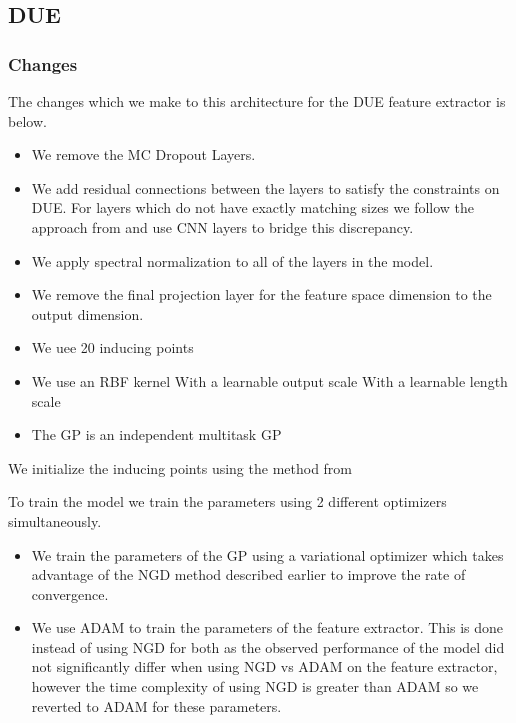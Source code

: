 \documentclass[12pt, a4paper]{report}
\theoremstyle{definition}
\theoremstyle{definition}
\theoremstyle{definition}
\begin{document}
\subsection{DUE}





\subsubsection{Changes}
The changes which we make to this architecture for the DUE feature extractor is below.
\begin{itemize}
    \item We remove the MC Dropout Layers.
    \item We add residual connections between the layers to satisfy the constraints on DUE. For layers which do not have exactly matching sizes we follow the approach from \cite{vanamersfoort2020uncertainty} and use CNN layers to bridge this discrepancy.
    \item We apply spectral normalization to all of the layers in the model. 
    \item We remove the final projection layer for the feature space dimension to the output dimension.
\end{itemize}




\begin{itemize}
    \item We uee 20 inducing points
    \item We use an RBF kernel
    \subitem With a learnable output scale
    \subitem With a learnable length scale
    \item The GP is an independent multitask GP
\end{itemize}

We initialize the inducing points using the method from \cite{}

To train the model we train the parameters using 2 different optimizers simultaneously.

\begin{itemize}
    \item We train the parameters of the GP using a variational optimizer which takes advantage of the NGD method described earlier to improve the rate of convergence.
    \item We use ADAM to train the parameters of the feature extractor. This is done instead of using NGD for both as the observed performance of the model did not significantly differ when using NGD vs ADAM on the feature extractor, however the time complexity of using NGD is greater than ADAM so we reverted to ADAM for these parameters.
\end{itemize}
\end{document}
